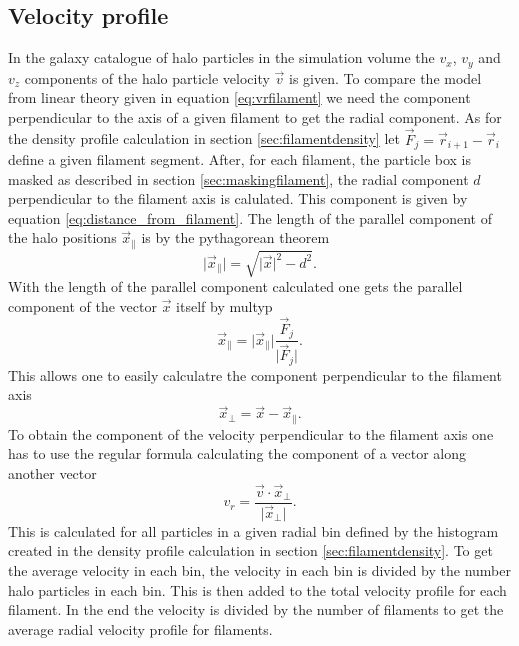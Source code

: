 \subsection{Velocity profile}\label{sec:numfilamentvelocity}
In the galaxy catalogue of halo particles in the simulation volume the $v_x$,
$v_y$ and $v_z$ components of the halo particle velocity $\vec{v}$ is given. To
compare the model from linear theory given in equation \ref{eq:vrfilament} we
need the component perpendicular to the axis of a given filament to get the
radial component. As for the density profile calculation in section
\ref{sec:filamentdensity} let $\vec{F}_j=\vec{r}_{i+1} - \vec{r}_i$ define a given
filament segment. After, for each filament, the particle box is masked as
described in section \ref{sec:maskingfilament}, the radial component $d$
perpendicular to the filament axis is calulated. This component is given by equation \ref{eq:distance_from_filament}. The length of the parallel component of the
halo positions $\vec{x}_\parallel$ is by the pythagorean theorem
\begin{equation}
    \vert\vec{x}_\parallel\vert=\sqrt{\vert \vec{x}\vert^2-d^2}.
\end{equation}
With the length of the parallel component calculated one gets the parallel component of the vector $\vec{x}$ itself
by multyp
\begin{equation}
    \vec{x}_\parallel=\vert\vec{x}_\parallel\vert\frac{\vec{F}_j}{\vert\vec{F}_j\vert}.
\end{equation}
This allows one to easily calculatre the component perpendicular to the filament
axis 
\begin{equation}
    \vec{x}_\perp=\vec{x}-\vec{x}_\parallel.
\end{equation}
To obtain the component of the velocity perpendicular to the filament axis one
has to use the regular formula calculating the component of a vector along
another vector
\begin{equation}
    v_r=\frac{\vec{v}\cdot\vec{x}_\perp}{\vert\vec{x}_\perp\vert}.
\end{equation}
This is calculated for all particles in a given radial bin defined by the
histogram created in the density profile calculation in section
\ref{sec:filamentdensity}. To get the average velocity in each bin, the velocity
in each bin is divided by the number halo particles in each bin. This is then
added to the total velocity profile for each filament. In the end the
velocity is divided by the number of filaments to get the average radial
velocity profile for filaments.
